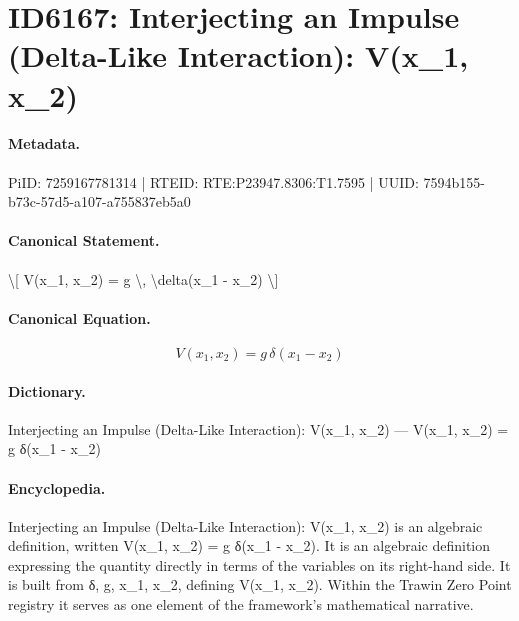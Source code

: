 \section*{ID6167: Interjecting an Impulse (Delta-Like Interaction): V(x\_1, x\_2)}
\paragraph{Metadata.}
PiID: 7259167781314 | RTEID: RTE:P23947.8306:T1.7595 | UUID: 7594b155-b73c-57d5-a107-a755837eb5a0

\paragraph{Canonical Statement.}
\textbackslash{}[ V(x\_1, x\_2) = g \textbackslash{}, \textbackslash{}delta(x\_1 - x\_2) \textbackslash{}]

\paragraph{Canonical Equation.}
\[
V(x_1, x_2) = g \, \delta(x_1 - x_2)
\]

\paragraph{Dictionary.}
Interjecting an Impulse (Delta-Like Interaction): V(x\_1, x\_2) — V(x\_1, x\_2) = g δ(x\_1 - x\_2)

\paragraph{Encyclopedia.}
Interjecting an Impulse (Delta-Like Interaction): V(x\_1, x\_2) is an algebraic definition, written V(x\_1, x\_2) = g δ(x\_1 - x\_2). It is an algebraic definition expressing the quantity directly in terms of the variables on its right-hand side. It is built from δ, g, x\_1, x\_2, defining V(x\_1, x\_2). Within the Trawin Zero Point registry it serves as one element of the framework's mathematical narrative.
